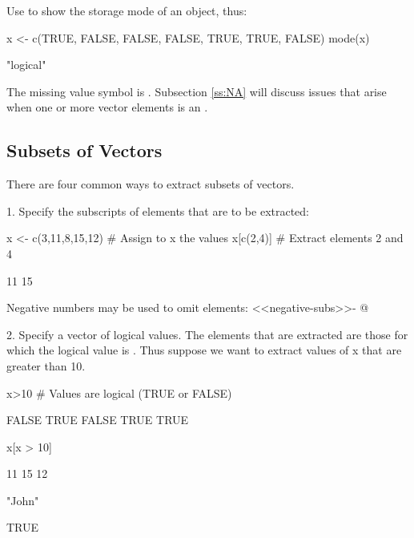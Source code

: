 Use  to show the storage mode of an object, thus:
\begin{Schunk}
\begin{Sinput}
x <- c(TRUE, FALSE, FALSE, FALSE, TRUE, TRUE, FALSE)
mode(x)
\end{Sinput}
\begin{Soutput}
[1] "logical"
\end{Soutput}
\end{Schunk}

The missing value symbol is .  Subsection \ref{ss:NA} will
discuss issues that arise when one or more vector elements is an .

\subsection*{Subsets of Vectors}
There are four common ways to extract subsets of vectors.

1. Specify the subscripts of elements that are to be extracted:
\begin{Schunk}
\begin{Sinput}
x <- c(3,11,8,15,12)   # Assign to x the values
x[c(2,4)]              # Extract elements 2 and 4
\end{Sinput}
\begin{Soutput}
[1] 11 15
\end{Soutput}
\end{Schunk}
\noindent
Negative numbers may be used to omit elements:
<<negative-subs>>-
@

2. Specify a vector of logical values.    The elements that are
  extracted are those for which the logical value is .
  Thus suppose we want to extract values of x that are greater than
  10.
\begin{Schunk}
\begin{Sinput}
x>10   # Values are logical (TRUE or FALSE)
\end{Sinput}
\begin{Soutput}
[1] FALSE  TRUE FALSE  TRUE  TRUE
\end{Soutput}
\begin{Sinput}
x[x > 10]
\end{Sinput}
\begin{Soutput}
[1] 11 15 12
\end{Soutput}
\begin{Sinput}
"John" %
\end{Sinput}
\begin{Soutput}
[1] TRUE
\end{Soutput}
\end{Schunk}


